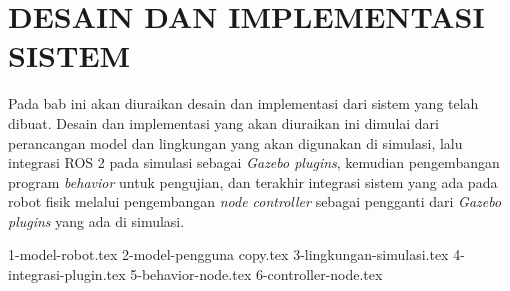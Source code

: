\chapter{DESAIN DAN IMPLEMENTASI SISTEM}
\label{chap:desainimplementasi}

Pada bab ini akan diuraikan desain dan implementasi dari sistem yang telah dibuat.
Desain dan implementasi yang akan diuraikan ini dimulai dari perancangan model dan lingkungan yang akan digunakan di simulasi,
  lalu integrasi ROS 2 pada simulasi sebagai \emph{Gazebo plugins},
  kemudian pengembangan program \emph{behavior} untuk pengujian,
  dan terakhir integrasi sistem yang ada pada robot fisik melalui pengembangan \emph{node controller} sebagai pengganti dari \emph{Gazebo plugins} yang ada di simulasi.

{1-model-robot.tex}
{2-model-pengguna copy.tex}
{3-lingkungan-simulasi.tex}
{4-integrasi-plugin.tex}
{5-behavior-node.tex}
{6-controller-node.tex}
